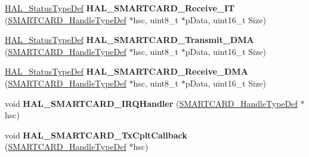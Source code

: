 \begin{DoxyCompactItemize}
\item 
\hyperlink{stm32f4xx__hal__def_8h_a63c0679d1cb8b8c684fbb0632743478f}{H\+A\+L\+\_\+\+Status\+Type\+Def} {\bfseries H\+A\+L\+\_\+\+S\+M\+A\+R\+T\+C\+A\+R\+D\+\_\+\+Receive\+\_\+\+IT} (\hyperlink{struct_s_m_a_r_t_c_a_r_d___handle_type_def}{S\+M\+A\+R\+T\+C\+A\+R\+D\+\_\+\+Handle\+Type\+Def} $\ast$hsc, uint8\+\_\+t $\ast$p\+Data, uint16\+\_\+t Size)\hypertarget{group___s_m_a_r_t_c_a_r_d___exported___functions___group2_ga52b04b11f8793a859f2105fd748d75cd}{}\label{group___s_m_a_r_t_c_a_r_d___exported___functions___group2_ga52b04b11f8793a859f2105fd748d75cd}

\item 
\hyperlink{stm32f4xx__hal__def_8h_a63c0679d1cb8b8c684fbb0632743478f}{H\+A\+L\+\_\+\+Status\+Type\+Def} {\bfseries H\+A\+L\+\_\+\+S\+M\+A\+R\+T\+C\+A\+R\+D\+\_\+\+Transmit\+\_\+\+D\+MA} (\hyperlink{struct_s_m_a_r_t_c_a_r_d___handle_type_def}{S\+M\+A\+R\+T\+C\+A\+R\+D\+\_\+\+Handle\+Type\+Def} $\ast$hsc, uint8\+\_\+t $\ast$p\+Data, uint16\+\_\+t Size)\hypertarget{group___s_m_a_r_t_c_a_r_d___exported___functions___group2_gab39a7dd50e44fd5c6cfc6af60bf8a4f5}{}\label{group___s_m_a_r_t_c_a_r_d___exported___functions___group2_gab39a7dd50e44fd5c6cfc6af60bf8a4f5}

\item 
\hyperlink{stm32f4xx__hal__def_8h_a63c0679d1cb8b8c684fbb0632743478f}{H\+A\+L\+\_\+\+Status\+Type\+Def} {\bfseries H\+A\+L\+\_\+\+S\+M\+A\+R\+T\+C\+A\+R\+D\+\_\+\+Receive\+\_\+\+D\+MA} (\hyperlink{struct_s_m_a_r_t_c_a_r_d___handle_type_def}{S\+M\+A\+R\+T\+C\+A\+R\+D\+\_\+\+Handle\+Type\+Def} $\ast$hsc, uint8\+\_\+t $\ast$p\+Data, uint16\+\_\+t Size)\hypertarget{group___s_m_a_r_t_c_a_r_d___exported___functions___group2_gaa8506576688d14e1f10f99d8c3f104fa}{}\label{group___s_m_a_r_t_c_a_r_d___exported___functions___group2_gaa8506576688d14e1f10f99d8c3f104fa}

\item 
void {\bfseries H\+A\+L\+\_\+\+S\+M\+A\+R\+T\+C\+A\+R\+D\+\_\+\+I\+R\+Q\+Handler} (\hyperlink{struct_s_m_a_r_t_c_a_r_d___handle_type_def}{S\+M\+A\+R\+T\+C\+A\+R\+D\+\_\+\+Handle\+Type\+Def} $\ast$hsc)\hypertarget{group___s_m_a_r_t_c_a_r_d___exported___functions___group2_ga5c09daa91f4d5f44c9b4c927a1c50b3e}{}\label{group___s_m_a_r_t_c_a_r_d___exported___functions___group2_ga5c09daa91f4d5f44c9b4c927a1c50b3e}

\item 
void {\bfseries H\+A\+L\+\_\+\+S\+M\+A\+R\+T\+C\+A\+R\+D\+\_\+\+Tx\+Cplt\+Callback} (\hyperlink{struct_s_m_a_r_t_c_a_r_d___handle_type_def}{S\+M\+A\+R\+T\+C\+A\+R\+D\+\_\+\+Handle\+Type\+Def} $\ast$hsc)\hypertarget{group___s_m_a_r_t_c_a_r_d___exported___functions___group2_gafb56eef6e839e909823cc16bf96c845b}{}\label{group___s_m_a_r_t_c_a_r_d___exported___functions___group2_gafb56eef6e839e909823cc16bf96c845b}


\end{DoxyCompactItemize}
